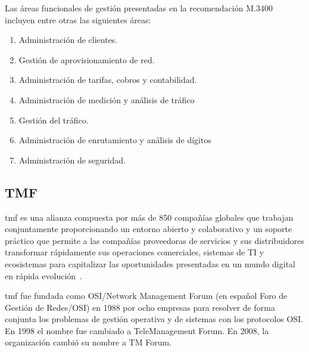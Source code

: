 Las áreas funcionales de gestión presentadas en la recomendación M.3400 incluyen entre otras las siguientes áreas: 
\begin{enumerate}
\item Administración de clientes.
\item Gestión de aprovisionamiento de red.
\item Administración de tarifas, cobros y contabilidad.
\item Administración de medición y análisis de tráfico
\item Gestión del tráfico.
\item Administración de enrutamiento y análisis de dígitos
\item Administración de seguridad.
\end{enumerate}


\subsection{TMF}

\acrfull{tmf} es una alianza compuesta por más de 850 compañías globales que trabajan conjuntamente proporcionando un entorno abierto y colaborativo y un soporte práctico que permite a las compañías proveedoras de servicios y sus distribuidores transformar rápidamente sus operaciones comerciales, sistemas de TI y ecosistemas para capitalizar las oportunidades presentadas en un mundo digital en rápida evolución~\cite{TMFORUM}.

\acrshort{tmf} fue fundada como OSI/Network Management Forum (en español Foro de Gestión de Redes/OSI) en 1988 por ocho empresas para resolver de forma conjunta los problemas de gestión operativa y de sistemas con los protocolos OSI. En 1998 el nombre fue cambiado a TeleManagement Forum. En 2008, la organización cambió su nombre a TM Forum.

